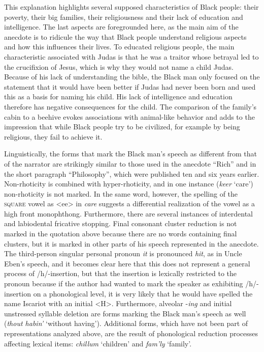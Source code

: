 This explanation highlights several supposed characteristics of Black people: their poverty, their big families, their religiousness and their lack of education and intelligence. The last aspects are foregrounded here, as the main aim of the anecdote is to ridicule the way that Black people understand religious aspects and how this influences their lives. To educated religious people, the main characteristic associated with Judas is that he was a traitor whose betrayal led to the crucifixion of Jesus, which is why they would not name a child Judas. Because of his lack of understanding the bible, the Black man only focused on the statement that it would have been better if Judas had never been born and used this as a basis for naming his child. His lack of intelligence and education therefore has negative consequences for the child. The comparison of the family’s cabin to a beehive evokes associations with animal-like behavior and adds to the impression that while Black people try to be civilized, for example by being religious, they fail to achieve it.

Linguistically, the forms that mark the Black man’s speech as different from that of the narrator are strikingly similar to those used in the anecdote “Rich” and in the short paragraph “Philosophy”, which were published ten and six years earlier. Non-rhoticity is combined with hyper-rhoticity, and in one instance (\emph{keer} ‘care’) non-rhoticity is not marked. In the same word, however, the spelling of the \textsc{square} vowel as <ee> in \emph{care} suggests a differential realization of the vowel as a high front monophthong. Furthermore, there are several instances of interdental and labiodental fricative stopping. Final consonant cluster reduction is not marked in the quotation above because there are no words containing final clusters, but it is marked in other parts of his speech represented in the anecdote. The third-person singular personal pronoun \emph{it} is pronounced \emph{hit}, as in Uncle Eben’s speech, and it becomes clear here that this does not represent a general process of /h/-insertion, but that the insertion is lexically restricted to the pronoun because if the author had wanted to mark the speaker as exhibiting /h/-insertion on a phonological level, it is very likely that he would have spelled the name Iscariot with an initial <H>. Furthermore, alveolar -\emph{ing} and initial unstressed syllable deletion are forms marking the Black man’s speech as well (\emph{thout habin’} ‘without having’). Additional forms, which have not been part of representations analyzed above, are the result of phonological reduction processes affecting lexical items: \emph{chillum} ‘children’ and \emph{fam’ly} ‘family’.

